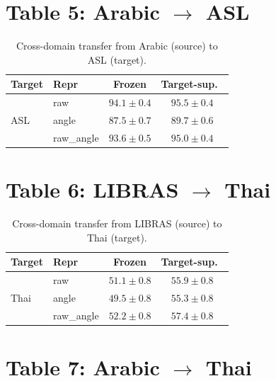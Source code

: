 \documentclass[11pt,a4paper]{article}
\begin{document}
\vspace{-0.5em}
\section*{Table 5: Arabic $\rightarrow$ ASL}
\vspace{-0.5em}

\begin{table}[H]
\centering
\small
\caption{Cross-domain transfer from Arabic (source) to ASL (target).}
\label{tab:arabic-asl}
\begin{tabular}{@{}llcc@{}}
\toprule
Target & Repr & Frozen & Target-sup.\ \\
\midrule
\multirow{3}{*}{ASL}
  & raw        & $\mathbf{94.1 \pm 0.4}$ & $\mathbf{95.5 \pm 0.4}$ \\
  & angle      & $87.5 \pm 0.7$ & $89.7 \pm 0.6$ \\
  & raw\_angle & $93.6 \pm 0.5$ & $95.0 \pm 0.4$ \\
\bottomrule
\end{tabular}
\end{table}

\vspace{-0.5em}
\section*{Table 6: LIBRAS $\rightarrow$ Thai}
\vspace{-0.5em}

\begin{table}[H]
\centering
\small
\caption{Cross-domain transfer from LIBRAS (source) to Thai (target).}
\label{tab:libras-thai}
\begin{tabular}{@{}llcc@{}}
\toprule
Target & Repr & Frozen & Target-sup.\ \\
\midrule
\multirow{3}{*}{Thai}
  & raw        & $51.1 \pm 0.8$ & $55.9 \pm 0.8$ \\
  & angle      & $49.5 \pm 0.8$ & $55.3 \pm 0.8$ \\
  & raw\_angle & $\mathbf{52.2 \pm 0.8}$ & $\mathbf{57.4 \pm 0.8}$ \\
\bottomrule
\end{tabular}
\end{table}

\vspace{-0.5em}
\section*{Table 7: Arabic $\rightarrow$ Thai}
\vspace{-0.5em}
\end{document}
